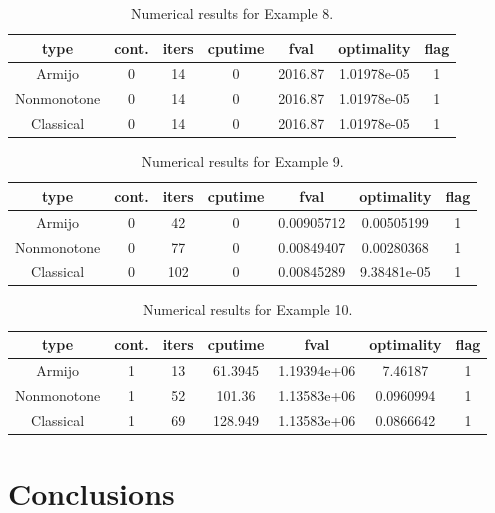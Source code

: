 \documentclass[a4paper]{article}
\begin{document}
  \begin{table}[p]
    \centering
    \begin{tabular}{cc|ccccc}
      \hline
      type & cont. & iters & cputime & 
      fval & optimality & flag \\ \hline
      Armijo & 0 & 14 & 0 & 2016.87 & 1.01978e-05 & 1 \\
      Nonmonotone & 0 & 14 & 0 & 2016.87 & 1.01978e-05 & 1 \\
      Classical & 0 & 14 & 0 & 2016.87 & 1.01978e-05 & 1 \\
      \hline
    \end{tabular}
    \caption{Numerical results for Example 8.}
    \label{tab8}
  \end{table}
  
  
  
  \begin{table}[p]
    \centering
    \begin{tabular}{cc|ccccc}
      \hline
      type & cont. & iters & cputime & 
      fval & optimality & flag \\ \hline
      Armijo & 0 & 42 & 0 & 0.00905712 & 0.00505199 & 1 \\
      Nonmonotone & 0 & 77 & 0 & 0.00849407 & 0.00280368 & 1 \\
      Classical & 0 & 102 & 0 & 0.00845289 & 9.38481e-05 & 1 \\
      \hline
    \end{tabular}
    \caption{Numerical results for Example 9.}
    \label{tab9}
  \end{table}
  
  
  
  \begin{table}[p]
    \centering
    \begin{tabular}{cc|ccccc}
      \hline
      type & cont. & iters & cputime & 
      fval & optimality & flag \\ \hline
      Armijo & 1 & 13 & 61.3945 & 1.19394e+06 & 7.46187 & 1 \\
      Nonmonotone & 1 & 52 & 101.36 & 1.13583e+06 & 0.0960994 & 1 \\
      Classical & 1 & 69 & 128.949 & 1.13583e+06 & 0.0866642 & 1 \\
      \hline
    \end{tabular}
    \caption{Numerical results for Example 10.}
    \label{tab10}
  \end{table}

  \section{Conclusions}
  \label{sec:concl}
  
\end{document}
